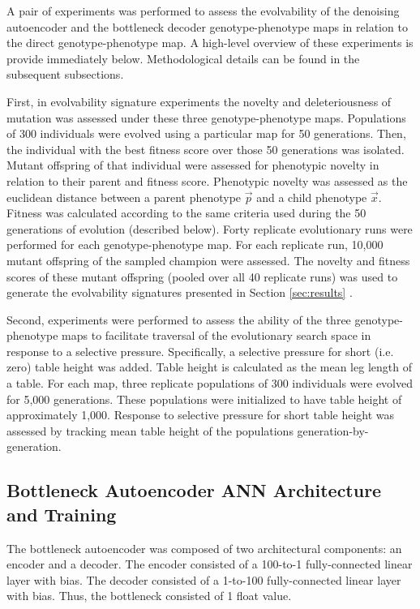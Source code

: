 A pair of experiments was performed to assess the evolvability of the denoising autoencoder and the bottleneck decoder genotype-phenotype maps in relation to the direct genotype-phenotype map.
A high-level overview of these experiments is provide immediately below.
Methodological details can be found in the subsequent subsections.

First, in evolvability signature experiments the novelty and deleteriousness of mutation was assessed under these three genotype-phenotype maps.
Populations of 300 individuals were evolved using a particular map for 50 generations.
Then, the individual with the best fitness score over those 50 generations was isolated.
Mutant offspring of that individual were assessed for phenotypic novelty in relation to their parent and fitness score.
Phenotypic novelty was assessed as the euclidean distance between a parent phenotype $\vec{p}$ and a child phenotype $\vec{x}$.
Fitness was calculated according to the same criteria used during the 50 generations of evolution (described below).
Forty replicate evolutionary runs were performed for each genotype-phenotype map.
For each replicate run, 10,000 mutant offspring of the sampled champion were assessed.
The novelty and fitness scores of these mutant offspring (pooled over all 40 replicate runs) was used to generate the evolvability signatures presented in Section \ref{sec:results} \cite{tarapore2015evolvability}.

Second, experiments were performed to assess the ability of the three genotype-phenotype maps to facilitate traversal of the evolutionary search space in response to a selective pressure.
Specifically, a selective pressure for short (i.e. zero) table height was added.
Table height is calculated as the mean leg length of a table.
For each map, three replicate populations of 300 individuals were evolved for 5,000 generations.
These populations were initialized to have table height of approximately 1,000.
Response to selective pressure for short table height was assessed by tracking mean table height of the populations generation-by-generation.

\subsection{Bottleneck Autoencoder ANN Architecture and Training}

The bottleneck autoencoder was composed of two architectural components: an encoder and a decoder.
The encoder consisted of a 100-to-1 fully-connected linear layer with bias.
The decoder consisted of a 1-to-100 fully-connected linear layer with bias.
Thus, the bottleneck consisted of 1 float value.


